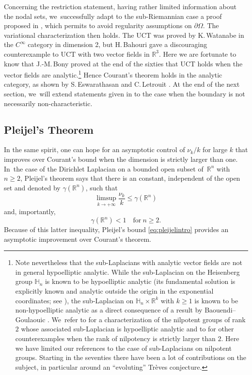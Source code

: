 \documentclass[11pt]{article}
\theoremstyle{definition}
\newcommand{\1}{\mathbbm{1}}
\newcommand{\R}{\mathbb{R}}
\numberwithin{equation}{section}
\begin{document}
Concerning the restriction statement, having rather limited information about the nodal sets, we~successfully adapt to the sub-Riemannian case a proof proposed in \cite{MP}, which permits to avoid regularity assumptions on $\partial \Omega$. The variational characterization then holds. The UCT was proved by K.\,Watanabe \cite{Wa} in the $C^\infty$ category in dimension 2, but H.\,Bahouri \cite{Ba, Ba2} gave a discouraging counterexample to UCT with two vector fields in $ \mathbb R^3$.
Here
we are fortunate to know that J.-M.\,Bony proved at the end of the sixties \cite{Bo} that UCT holds when the vector fields are analytic.\footnote{Note nevertheless that the sub-Laplacians with analytic vector fields are not in general hypoelliptic analytic. While the sub-Laplacian on the Heisenberg group $\mathbb H_n$ is known to be hypoelliptic analytic (its fundamental solution is explicitly known and analytic outside the origin
in the exponential coordinates; see \cite{Fo0}), the sub-Laplacian on $\mathbb H_n\times \mathbb R^k$ with $k\geq 1$ is known to be non-hypoelliptic analytic as a direct consequence of a result by Baouendi--Goulaouic \cite{BaGo}. We~refer to \cite{Me2} for a characterization of the nilpotent groups of rank $2$ whose associated sub-Laplacian is hypoelliptic analytic and to \cite{Hel} for other counterexamples when the rank of nilpotency is strictly larger than $2$. Here we have limited our references to the case of sub-Laplacians on nilpotent groups. Starting in the seventies there have been a lot of contributions on the subject, in particular around an ``evoluting'' Trèves conjecture.}
Hence Courant's theorem holds in the analytic category, as shown by S.\,Eswarathasan and C.\,Letrouit \cite{EL}. At the end of the next section, we~will extend statements given in \cite{EL} to the case when the boundary is not necessarily non-characteristic.

\subsection{Pleijel's Theorem}
In the same spirit, one can hope for an asymptotic control of $ \nu_k/k$ for large $k$ that improves over Courant's bound when the dimension is strictly larger than one. In~the case of the Dirichlet Laplacian on a bounded open subset of~$\mathbb R^n$ with $n\geq 2$, Pleijel's theorem \cite{Pl} says that there is an constant, independent of the open set and denoted by $\gamma(\mathbb R^n)$, such that
\begin{equation}
\label{eq:pleijelintro}
\limsup_{k\to +\infty} \frac{\nu_k}{k} \leq \gamma(\R^n)
\end{equation}
and, importantly,
\begin{equation}
\label{eq:pleijelintro2}
\gamma(\R^n)<1
\quad\text{for}\ n\geq 2.
\end{equation}
Because of this latter inequality, Pleijel's bound \eqref{eq:pleijelintro} provides an asymptotic improvement over Courant's theorem.
\end{document}
